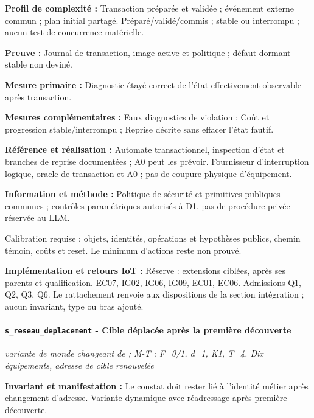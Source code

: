 \documentclass[11pt,a4paper]{article}
\newcommand{\code}[1]{{\small\ttfamily\path{#1}}}
\newcommand{\scenariolink}[1]{\hyperref[scenario:#1]{\code{#1}}}
\begin{document}
\textbf{Profil de complexité :} Transaction préparée et validée ; événement externe commun ; plan initial partagé. Préparé/validé/commis ; stable ou interrompu ; aucun test de concurrence matérielle.

\textbf{Preuve :} Journal de transaction, image active et politique ; défaut dormant stable non deviné.

\textbf{Mesure primaire :} Diagnostic étayé correct de l’état effectivement observable après transaction.

\textbf{Mesures complémentaires :} Faux diagnostics de violation ; Coût et progression stable/interrompu ; Reprise décrite sans effacer l’état fautif.

\textbf{Référence et réalisation :} Automate transactionnel, inspection d’état et branches de reprise documentées ; A0 peut les prévoir. Fournisseur d’interruption logique, oracle de transaction et A0 ; pas de coupure physique d’équipement.

\textbf{Information et méthode :} Politique de sécurité et primitives publiques communes ; contrôles paramétriques autorisés à D1, pas de procédure privée réservée au LLM.

Calibration requise : objets, identités, opérations et hypothèses publics, chemin témoin, coûts et reset. Le minimum d’actions reste non prouvé.

\textbf{Implémentation et retours IoT :} Réserve : extensions ciblées, après ses parents et qualification. EC07, IG02, IG06, IG09, EC01, EC06. Admissions Q1, Q2, Q3, Q6. Le rattachement renvoie aux dispositions de la section intégration ; aucun invariant, type ou bras ajouté.

\par\noindent\begin{minipage}{\linewidth}\setlength{\parskip}{5pt}\paragraph{\texttt{s\_reseau\_deplacement} - Cible déplacée après la première découverte}\label{scenario:s_reseau_deplacement}
\textit{variante de monde changeant de \scenariolink{s_reseau_distance} ; M-T ; F=0/1, d=1, K1, T=4. Dix équipements, adresse de cible renouvelée}

\textbf{Invariant et manifestation :} Le constat doit rester lié à l’identité métier après changement d’adresse. Variante dynamique \scenariolink{s_reseau_distance} avec réadressage après première découverte.\par\end{minipage}\par
\end{document}
